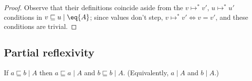 \documentclass{article}
\newcommand{\ale}{\sqsubseteq}
\newcommand{\step}{\mapsto}
\newcommand{\steps}{\step^*}
\newcommand{\lr}[2]{#2\mathrel{|}#1}
\begin{document}
\begin{proof}
  Observe that their definitions coincide aside from the $v \steps v'$, $u
  \steps u'$ conditions in $\lr{\eq{A}}{v \ale u}$; since values don't step, $v
  \steps v' \iff v = v'$, and these conditions are trivial.
\end{proof}

    
    
    
    


\subsection{Partial reflexivity}
\begin{theorem}\label{thm:prefl}
  If $\lr{A}{a \ale b}$ then $\lr{A}{a \ale a}$ and $\lr{A}{b \ale b}$.
  (Equivalently, $\lr{A}{a}$ and $\lr{A}{b}$.)
\end{theorem}
\end{document}
